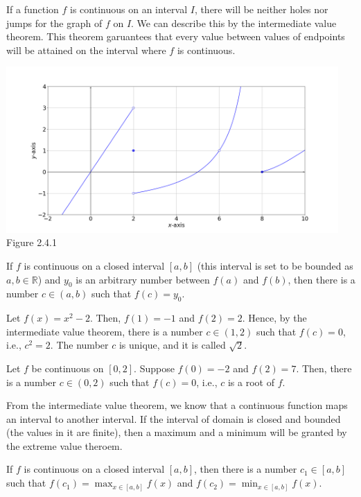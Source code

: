 \documentclass[11pt]{book}
\theoremstyle{break}
\theoremstyle{no_label}
\newcommand{\bbR}{\mathbb{R}}
\newcommand{\figtag}[1]{\\[-1.2em]Figure {#1}}
\numberwithin{equation}{section}
\begin{document}
If a function $f$ is continuous on an interval $I$, there will be neither holes nor jumps for the graph of $f$ on $I$. We can describe this by the intermediate value theorem. This theorem garuantees that every value between values of endpoints will be attained on the interval where $f$ is continuous.

\begin{center}
    \includegraphics[width=0.95\textwidth]{discontinuity.png}\figtag{2.4.1}
\end{center}

\begin{theorem}
    If $f$ is continuous on a closed interval $[a, b]$ (this interval is set to be bounded as $a, b\in\bbR$) and $y_0$ is an arbitrary number between $f(a)$ and $f(b)$, then there is a number $c\in(a, b)$ such that $f(c)=y_0$.
\end{theorem}

\begin{example}
    Let $f(x)=x^2-2$. Then, $f(1)=-1$ and $f(2)=2$. Hence, by the intermediate value theorem, there is a number $c\in(1, 2)$ such that $f(c)=0$, i.e., $c^2=2$. The number $c$ is unique, and it is called $\sqrt{2}$.
\end{example}

\begin{example}
    Let $f$ be continuous on $[0, 2]$. Suppose $f(0)=-2$ and $f(2)=7$. Then, there is a number $c\in(0, 2)$ such that $f(c)=0$, i.e., $c$ is a root of $f$.
\end{example}

From the intermediate value theorem, we know that a continuous function maps an interval to another interval. If the interval of domain is closed and bounded (the values in it are finite), then a maximum and a minimum will be granted by the extreme value theroem.

\begin{theorem}
    If $f$ is continuous on a closed interval $[a, b]$, then there is a number $c_1\in[a, b]$ such that $\displaystyle f(c_1)=\max_{x\in[a, b]}f(x)$ and $\displaystyle f(c_2)=\min_{x\in[a, b]}f(x)$.
\end{theorem}
\end{document}
